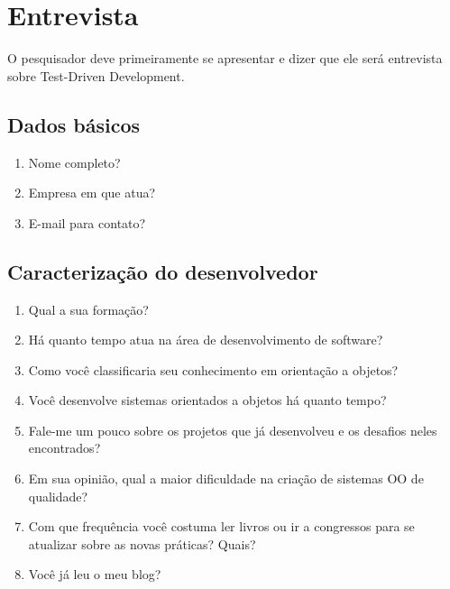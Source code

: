 \chapter{Entrevista}
\label{ape:entrevista}

O pesquisador deve primeiramente se apresentar e dizer que ele será entrevista
sobre Test-Driven Development.

\section{Dados básicos}
\label{entrevista:dados-basicos}

\begin{enumerate}
	\item Nome completo?

	\item Empresa em que atua?

	\item E-mail para contato?

\end{enumerate}

\section{Caracterização do desenvolvedor}
\label{entrevista:caracterizacao}

\begin{enumerate}
	\item Qual a sua formação?

	\item Há quanto tempo atua na área de desenvolvimento de software?

	\item Como você classificaria seu conhecimento em orientação a objetos?

	\item Você desenvolve sistemas orientados a objetos há quanto tempo?	

	\item Fale-me um pouco sobre os projetos que já desenvolveu e os desafios 
	neles encontrados?

	\item Em sua opinião, qual a maior dificuldade na criação de sistemas OO de
	qualidade?

	\item Com que frequência você costuma ler livros ou ir a congressos para se 
	atualizar sobre as novas práticas? Quais?
	
	\item Você já leu o meu blog?
\end{enumerate}


